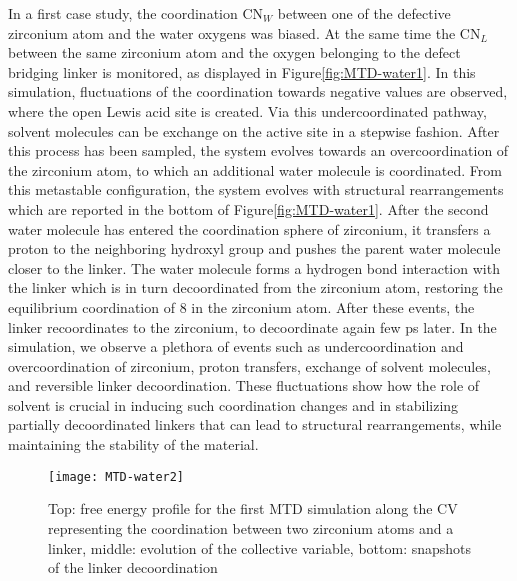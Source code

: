 In a first case study, the coordination CN$_W$ between one of the defective zirconium atom and the water oxygens was biased. At the same time the CN$_L$ between the same zirconium atom and the oxygen belonging to the defect bridging linker is monitored, as displayed in Figure\ref{fig:MTD-water1}. In this simulation, fluctuations of the coordination towards negative values are observed, where the open Lewis acid site is created. Via this undercoordinated pathway, solvent molecules can be exchange on the active site in a stepwise fashion. After this process has been sampled, the system evolves towards an overcoordination of the zirconium atom, to which an additional water molecule is coordinated. From this metastable configuration, the system evolves with structural rearrangements which are reported in the bottom of Figure\ref{fig:MTD-water1}. After the second water molecule has entered the coordination sphere of zirconium, it transfers a proton to the neighboring hydroxyl group and pushes the parent water molecule closer to the linker. The water molecule forms a hydrogen bond interaction with the linker which is in turn decoordinated from the zirconium atom, restoring the equilibrium coordination of 8 in the zirconium atom. After these events, the linker recoordinates to the zirconium, to decoordinate again few ps later. In the simulation, we observe a plethora of events such as undercoordination and overcoordination of zirconium, proton transfers, exchange of solvent molecules, and reversible linker decoordination. These fluctuations show how the role of solvent is crucial in inducing such coordination changes and in stabilizing partially decoordinated linkers that can lead to structural rearrangements, while maintaining the stability of the material. 
\npar
\begin{figure}[!htbp]
	\centering
	\texttt{[image: MTD-water2]}
	\caption{Top: free energy profile for the first MTD simulation along the CV representing the coordination between two zirconium atoms and a linker, middle: evolution of the collective variable, bottom: snapshots of the linker decoordination}
	\label{fig:MTD-water2}
\end{figure}
